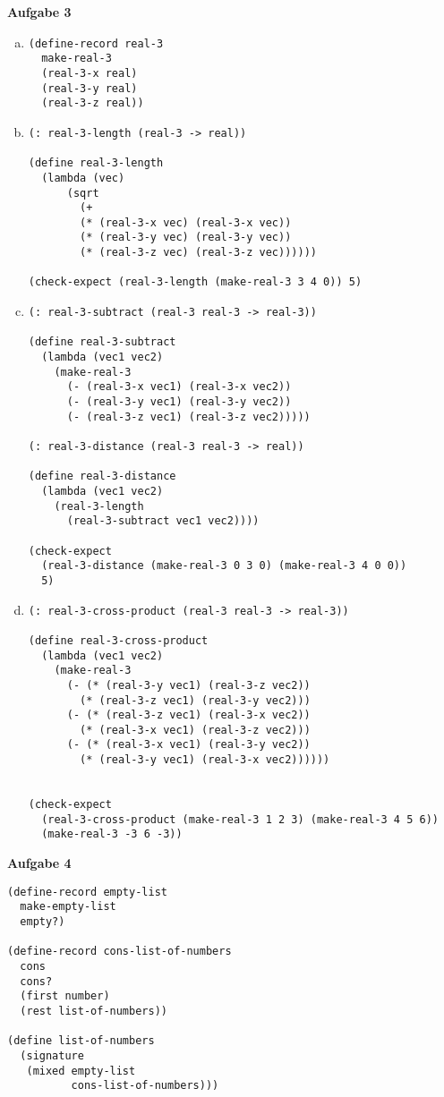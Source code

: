\documentclass[a4paper,12pt]{article}
\newcommand{\Aufgabe}[1]{
  {
  \vspace*{0.5cm}
  \textsf{\textbf{Aufgabe #1}}
  \vspace*{0.2cm}

  }
}
\begin{document}
\Aufgabe{3}
\begin{enumerate}[a)]
  \item \begin{verbatim}
(define-record real-3
  make-real-3
  (real-3-x real)
  (real-3-y real)
  (real-3-z real))
    \end{verbatim}
  \item \begin{verbatim}
(: real-3-length (real-3 -> real))

(define real-3-length
  (lambda (vec)
      (sqrt
        (+
        (* (real-3-x vec) (real-3-x vec))
        (* (real-3-y vec) (real-3-y vec))
        (* (real-3-z vec) (real-3-z vec))))))

(check-expect (real-3-length (make-real-3 3 4 0)) 5)
    \end{verbatim}
  \item \begin{verbatim}
(: real-3-subtract (real-3 real-3 -> real-3))

(define real-3-subtract
  (lambda (vec1 vec2)
    (make-real-3
      (- (real-3-x vec1) (real-3-x vec2))
      (- (real-3-y vec1) (real-3-y vec2))
      (- (real-3-z vec1) (real-3-z vec2)))))

(: real-3-distance (real-3 real-3 -> real))

(define real-3-distance
  (lambda (vec1 vec2)
    (real-3-length
      (real-3-subtract vec1 vec2))))

(check-expect
  (real-3-distance (make-real-3 0 3 0) (make-real-3 4 0 0))
  5)
  \end{verbatim}
  \item \begin{verbatim}
(: real-3-cross-product (real-3 real-3 -> real-3))

(define real-3-cross-product
  (lambda (vec1 vec2)
    (make-real-3
      (- (* (real-3-y vec1) (real-3-z vec2))
        (* (real-3-z vec1) (real-3-y vec2)))
      (- (* (real-3-z vec1) (real-3-x vec2))
        (* (real-3-x vec1) (real-3-z vec2)))
      (- (* (real-3-x vec1) (real-3-y vec2))
        (* (real-3-y vec1) (real-3-x vec2))))))


(check-expect
  (real-3-cross-product (make-real-3 1 2 3) (make-real-3 4 5 6))
  (make-real-3 -3 6 -3))
  \end{verbatim}
\end{enumerate}

\Aufgabe{4}

\begin{verbatim}
(define-record empty-list
  make-empty-list
  empty?)

(define-record cons-list-of-numbers
  cons
  cons?
  (first number)
  (rest list-of-numbers))

(define list-of-numbers
  (signature
   (mixed empty-list
          cons-list-of-numbers)))
\end{verbatim}
\end{document}
